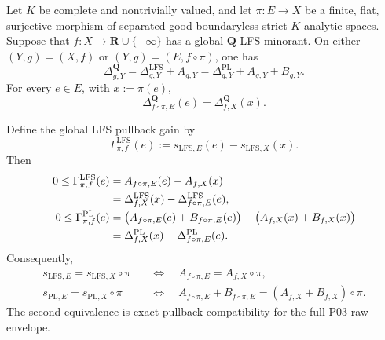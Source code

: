 \begin{theorem}
\label{thm:p031-rational-defect-conservation}
Let $K$ be complete and nontrivially valued, and let
$\pi:E\to X$ be a finite, flat, surjective morphism of separated good
boundaryless strict $K$-analytic spaces.  Suppose that
$f:X\to\mathbf R\cup\{-\infty\}$ has a global $\mathbf Q$-LFS
minorant.  On either $(Y,g)=(X,f)$ or
$(Y,g)=(E,f\circ\pi)$, one has
\begin{equation}
\label{eq:p031-three-level-defect-ledger}
 \Delta^{\mathbf Q}_{g,Y}
   =\Delta^{\mathrm{LFS}}_{g,Y}+A_{g,Y}
   =\Delta^{\mathrm{PL}}_{g,Y}+A_{g,Y}+B_{g,Y}.
\end{equation}
For every $e\in E$, with $x:=\pi(e)$,
\begin{equation}
\label{eq:p031-rational-defect-conservation}
 \Delta^{\mathbf Q}_{f\circ\pi,E}(e)
       =\Delta^{\mathbf Q}_{f,X}(x).
\end{equation}

Define the global LFS pullback gain by
\[
 \Gamma^{\mathrm{LFS}}_{\pi,f}(e)
   :=s_{\mathrm{LFS},E}(e)-s_{\mathrm{LFS},X}(x).
\]
Then
\begin{align}
 0\leq\Gamma^{\mathrm{LFS}}_{\pi,f}(e)
   &=A_{f\circ\pi,E}(e)-A_{f,X}(x) \notag\\
   &=\Delta^{\mathrm{LFS}}_{f,X}(x)
      -\Delta^{\mathrm{LFS}}_{f\circ\pi,E}(e),
\label{eq:p031-finite-flat-lfs-gap-balance}\\
 0\leq\Gamma^{\mathrm{PL}}_{\pi,f}(e)
   &=\bigl(A_{f\circ\pi,E}(e)+B_{f\circ\pi,E}(e)\bigr)
      -\bigl(A_{f,X}(x)+B_{f,X}(x)\bigr) \notag\\
   &=\Delta^{\mathrm{PL}}_{f,X}(x)
      -\Delta^{\mathrm{PL}}_{f\circ\pi,E}(e).
\label{eq:p031-finite-flat-pl-two-gap-balance}
\end{align}
Consequently,
\begin{align}
 s_{\mathrm{LFS},E}=s_{\mathrm{LFS},X}\circ\pi
 &\quad\Longleftrightarrow\quad
 A_{f\circ\pi,E}=A_{f,X}\circ\pi,
\label{eq:p031-lfs-compatibility-gap-criterion}\\
 s_{\mathrm{PL},E}=s_{\mathrm{PL},X}\circ\pi
 &\quad\Longleftrightarrow\quad
 A_{f\circ\pi,E}+B_{f\circ\pi,E}
   =(A_{f,X}+B_{f,X})\circ\pi.
\label{eq:p031-p03-compatibility-total-gap-criterion}
\end{align}
The second equivalence is exact pullback compatibility for the full P03
raw envelope.
\end{theorem}

